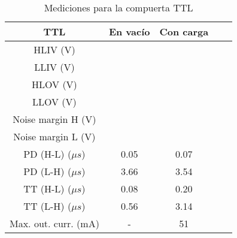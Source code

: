 \documentclass[../../e3_tp2_main.tex]{subfiles}
\begin{document}
\begin{table}[H]
	\centering
	\begin{tabular}{|c|c|c|c|c|}
	\hline
        TTL                          				& En vac\'io & Con carga \\ \hline \hline
	HLIV (V)                          			&                      &                        \\ \hline
	LLIV (V)                          			&                      &                       \\ \hline
	HLOV (V)                          			&                      &                 \\ \hline
	LLOV (V)                          			&                      &                         \\ \hline
	Noise margin H (V)                     	&                      &                                \\ \hline
	Noise margin L (V)				&			&				\\ \hline
	PD (H-L) ($\mu s$)	& 0.05               & 0.07                  \\ \hline
	PD (L-H) ($\mu s$) 	& 3.66               & 3.54                   \\ \hline
	TT (H-L) ($\mu s$)   	& 0.08               & 0.20              \\ \hline
	TT (L-H) ($\mu s$)   	& 0.56               & 3.14                    \\ \hline
	Max. out. curr. (mA)       	& -                    & 51               \\ \hline

	\end{tabular}
	
	\caption{Mediciones para la compuerta TTL}
	\label{table:1-mediciones-ttl}
\end{table}
\end{document}
